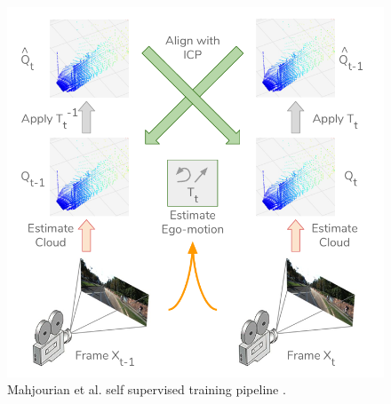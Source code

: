 \begin{figure}
	\centering
	\includegraphics[scale=0.3]{figs/vid2depth}
	\caption{Mahjourian et al. self supervised training pipeline \cite{vid2depth}. \label{fig:vid2depth}}
\end{figure}

